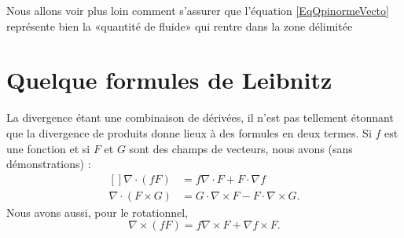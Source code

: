 \begin{remark}
    Nous allons voir plus loin comment s'assurer que l'équation \eqref{EqQpinormeVecto} représente bien la «quantité de fluide» qui rentre dans la zone délimitée
\end{remark}


\section{Quelque formules de Leibnitz}

La divergence étant une combinaison de dérivées, il n'est pas tellement étonnant que la divergence de produits donne lieux à des formules en deux termes. Si $f$ est une fonction et si $F$ et $G$ sont des champs de vecteurs, nous avons (sans démonstrations) :
\begin{equation}        \label{EqLeinDivNablRot}
    \begin{aligned}[]
        \nabla\cdot(fF)&=f\nabla\cdot F+F\cdot\nabla f\\
        \nabla\cdot(F\times G)&=G\cdot\nabla\times F-F\cdot\nabla\times G.
    \end{aligned}
\end{equation}
Nous avons aussi, pour le rotationnel,
\begin{equation}        \label{EqLeinRotfFF}
    \nabla\times(fF)=f\nabla\times F+\nabla f\times F.
\end{equation}
